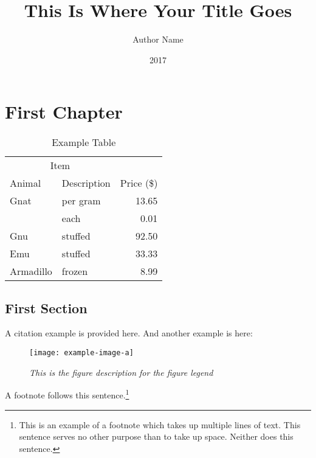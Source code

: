 \documentclass{sinai}
\author{Author Name}
\title{This Is Where Your Title Goes}
\date{2017}
\begin{document}
\frontmatter

\maketitle
\setcounter{page}{2}

\makecopyright

\makeapprovals

\begin{abstract}
\lipsum[1-2]
\end{abstract}

\begin{thank}
\lipsum[3]
\end{thank}

\singlespacing
\tableofcontents
\listoftables
\listoffigures

\mainmatter
\doublespacing
\chapter{First Chapter}

\lipsum[1]

\begin{table}[]
\centering
\caption{Example Table}
\label{my-label}
\begin{tabular}{@{}llr@{}}
\toprule
\multicolumn{2}{c}{Item} &            \\ \cmidrule(r){1-2}
Animal     & Description & Price (\$) \\ \midrule
Gnat       & per gram    & 13.65      \\
           & each        & 0.01       \\
Gnu        & stuffed     & 92.50      \\
Emu        & stuffed     & 33.33      \\
Armadillo  & frozen      & 8.99       \\ \bottomrule
\end{tabular}
\end{table}

\section{First Section}
A citation example \cite{augustine} is provided here. And another example is here: \cite{gillies}

\lipsum[2]




\begin{figure}[H]
\centering\texttt{[image: example-image-a]}
  \caption[This is the figure description for the figure list.]{\textit{This is the figure description for the figure legend} \lipsum[1]}
  \label{fig:heatmap}
\end{figure}
\lipsum[3-5]
A footnote follows this sentence.\footnote{This is an example of a footnote which takes up multiple lines of text. This sentence serves no other purpose than to take up space. Neither does this sentence.}
\end{document}
